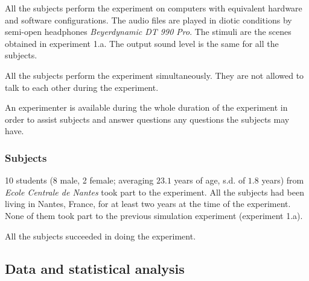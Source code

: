 \documentclass[12pt]{elsarticle}
\begin{document}
All the subjects perform the experiment on computers with equivalent hardware and software configurations. The audio files are played in diotic conditions by semi-open headphones \emph{Beyerdynamic DT 990 Pro}. The stimuli are the scenes obtained in experiment 1.a. The output sound level is the same for all the subjects.


All the subjects perform the experiment simultaneously. They are not allowed to talk to each other during the experiment.


An experimenter is available during the whole duration of the experiment in order to assist subjects and answer questions any questions the subjects may have.

\subsubsection*{Subjects}


10 students (8 male, 2 female; averaging $23.1$ years of age, s.d. of $1.8$ years) from \emph{Ecole Centrale de Nantes} took part to the experiment. All the subjects had been living in Nantes, France, for at least two years at the time of the experiment. None of them took part to the previous simulation experiment (experiment 1.a).


All the subjects succeeded in doing the experiment.

\subsection{Data and statistical analysis}
\label{sec:xp1_dataAna}
\end{document}
